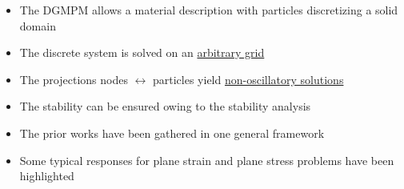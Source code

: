 \documentclass[11pt,aspectratio=169]{beamer}
\begin{document}
\frame[plain,]{\sectionpage}
\setcounter{section}{0}

\begin{frame}[standout]{}
  \begin{footnotesize}
    \begin{block}{}
      \begin{itemize}
      \item[] The DGMPM allows a material description with particles discretizing a solid domain
      \item[] The discrete system is solved on an \underline{arbitrary grid}
      \item[] The projections nodes $\leftrightarrow$ particles yield \underline{non-oscillatory solutions}
      \item[] The stability can be ensured owing to the stability analysis
      \end{itemize}

  \end{block}

  \begin{block}{}
    \begin{itemize}
    \item[] The prior works have been gathered in one general framework
    \item[] Some typical responses for plane strain and plane stress problems have been highlighted
    \end{itemize}
  \end{block}

  \end{footnotesize}
\end{frame}
\end{document}
